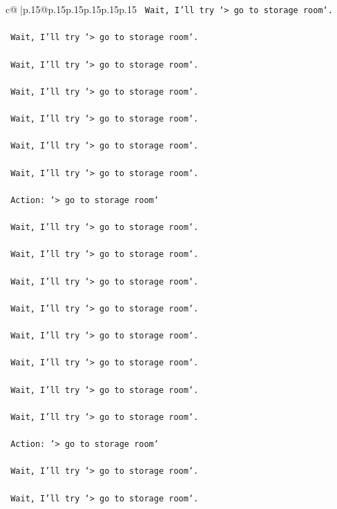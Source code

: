 \documentclass{article}
\begin{document}
{\begin{supertabular}{c@{$\;$}|p{.15\linewidth}@{}p{.15\linewidth}p{.15\linewidth}p{.15\linewidth}p{.15\linewidth}p{.15\linewidth}}
{{{\texttt{    Wait, I'll try `> go to storage room`.} \\
\\ 
\texttt{    Wait, I'll try `> go to storage room`.} \\
\\ 
\texttt{    Wait, I'll try `> go to storage room`.} \\
\\ 
\texttt{    Wait, I'll try `> go to storage room`.} \\
\\ 
\texttt{    Wait, I'll try `> go to storage room`.} \\
\\ 
\texttt{    Wait, I'll try `> go to storage room`.} \\
\\ 
\texttt{    Wait, I'll try `> go to storage room`.} \\
\\ 
\texttt{    Action: `> go to storage room`} \\
\\ 
\texttt{    Wait, I'll try `> go to storage room`.} \\
\\ 
\texttt{    Wait, I'll try `> go to storage room`.} \\
\\ 
\texttt{    Wait, I'll try `> go to storage room`.} \\
\\ 
\texttt{    Wait, I'll try `> go to storage room`.} \\
\\ 
\texttt{    Wait, I'll try `> go to storage room`.} \\
\\ 
\texttt{    Wait, I'll try `> go to storage room`.} \\
\\ 
\texttt{    Wait, I'll try `> go to storage room`.} \\
\\ 
\texttt{    Wait, I'll try `> go to storage room`.} \\
\\ 
\texttt{    Action: `> go to storage room`} \\
\\ 
\texttt{    Wait, I'll try `> go to storage room`.} \\
\\ 
\texttt{    Wait, I'll try `> go to storage room`.} \\
\\ 
}}}
\end{supertabular}}
\end{document}

